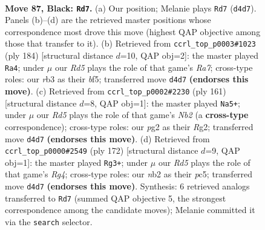 \documentclass[11pt]{article}
\begin{document}
\clearpage

\begin{figure}[p]\centering
\begin{subfigure}{0.46\textwidth}\centering
\resizebox{\linewidth}{!}{%
\newchessgame
\chessboard[
  setfen={8/8/k7/5K2/3r4/1R6/1N4P1/8 b - - 39 87},
  showmover=false,
  pgfstyle=straightmove, color=movearrow, markmove={d4-d7}
]}
\caption{}
\end{subfigure}\hfill
\begin{subfigure}{0.46\textwidth}\centering
\resizebox{\linewidth}{!}{%
\newchessgame
\chessboard[
  setfen={8/R7/4n2k/5b2/7p/8/7K/8 w - - 36 93},
  showmover=false,
  pgfstyle=straightmove, color=movearrow, markmove={a7-a4}
]}
\caption{}
\end{subfigure}
\\[4pt]
\begin{subfigure}{0.46\textwidth}\centering
\resizebox{\linewidth}{!}{%
\newchessgame
\chessboard[
  setfen={8/1n6/1k6/8/8/1K6/6r1/1N1R4 b - - 16 81},
  showmover=false,
  pgfstyle=straightmove, color=movearrow, markmove={b7-a5}
]}
\caption{}
\end{subfigure}\hfill
\begin{subfigure}{0.46\textwidth}\centering
\resizebox{\linewidth}{!}{%
\newchessgame
\chessboard[
  setfen={8/2r5/8/2pP4/6R1/3k4/5K2/8 w - - 1 87},
  showmover=false,
  pgfstyle=straightmove, color=movearrow, markmove={g4-g3}
]}
\caption{}
\end{subfigure}
\caption{\textbf{Move 87, Black: \texttt{Rd7}.} (a) Our position; Melanie plays \texttt{Rd7} (\texttt{d4d7}). Panels (b)--(d) are the retrieved master positions whose correspondence most drove this move (highest QAP objective among those that transfer to it). (b) Retrieved from \texttt{ccrl\_top\_p0003\#1023} (ply 184) [structural distance $d$=10, QAP obj=2]: the master played \texttt{Ra4}; under $\mu$ our \emph{Rd5} plays the role of that game's \emph{Ra7}; cross-type roles: our \emph{r}b3 as their \emph{b}f5; transferred move \texttt{d4d7} \textbf{(endorses this move)}. (c) Retrieved from \texttt{ccrl\_top\_p0002\#2230} (ply 161) [structural distance $d$=8, QAP obj=1]: the master played \texttt{Na5+}; under $\mu$ our \emph{Rd5} plays the role of that game's \emph{Nb2} (a \textbf{cross-type} correspondence); cross-type roles: our \emph{p}g2 as their \emph{R}g2; transferred move \texttt{d4d7} \textbf{(endorses this move)}. (d) Retrieved from \texttt{ccrl\_top\_p0000\#2549} (ply 172) [structural distance $d$=9, QAP obj=1]: the master played \texttt{Rg3+}; under $\mu$ our \emph{Rd5} plays the role of that game's \emph{Rg4}; cross-type roles: our \emph{n}b2 as their \emph{p}c5; transferred move \texttt{d4d7} \textbf{(endorses this move)}. Synthesis: 6 retrieved analogs transferred to \texttt{Rd7} (summed QAP objective 5, the strongest correspondence among the candidate moves); Melanie committed it via the \texttt{search} selector.}
\label{fig:thought-m173}
\end{figure}
\end{document}
